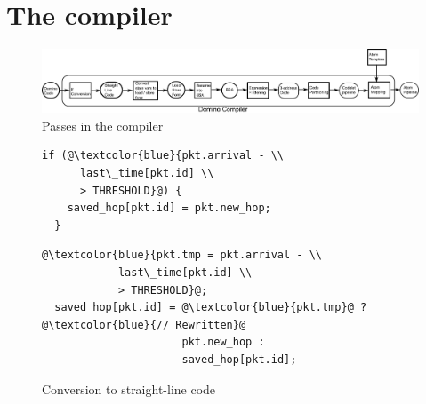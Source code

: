 \section{The \pktlanguage compiler}
\label{s:compiler}

\begin{figure}[!t]
  \includegraphics[width=\textwidth]{compiler.pdf}
  \caption{Passes in the \pktlanguage compiler}
  \label{fig:passes}
\end{figure}

\begin{figure}[!t]
  \begin{minipage}{0.47\textwidth}
  \begin{small}
  \begin{lstlisting}[style=customc]
  if (@\textcolor{blue}{pkt.arrival - \\
      last\_time[pkt.id] \\
      > THRESHOLD}@) {
    saved_hop[pkt.id] = pkt.new_hop;
  }
  \end{lstlisting}
  \end{small}
  \end{minipage}
  \begin{minipage}{0.53\textwidth}
  \begin{small}
  \begin{lstlisting}[style=customc]
  @\textcolor{blue}{pkt.tmp = pkt.arrival - \\
            last\_time[pkt.id] \\
            > THRESHOLD}@;
  saved_hop[pkt.id] = @\textcolor{blue}{pkt.tmp}@ ? @\textcolor{blue}{// Rewritten}@
                      pkt.new_hop :
                      saved_hop[pkt.id];
  \end{lstlisting}
  \end{small}
  \end{minipage}
\caption{Conversion to straight-line code}
\label{fig:if_convert}
\end{figure}

